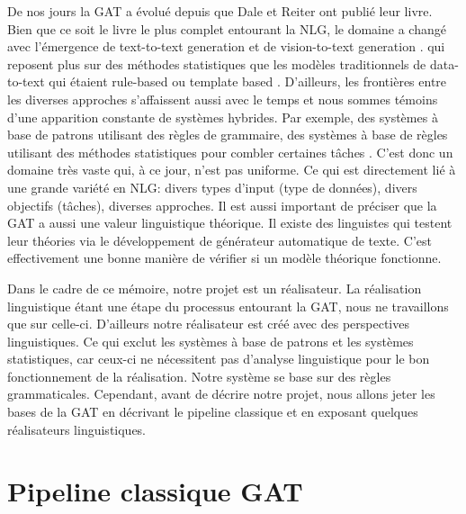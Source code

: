 De nos jours la \ac{GAT} a évolué depuis que Dale et Reiter ont publié leur livre. Bien que ce soit le livre le plus complet entourant la NLG, le domaine a changé avec l'émergence de text-to-text generation et de vision-to-text generation \citep{DBLP:journals/corr/HendricksARDSD16}. qui reposent plus sur des méthodes statistiques que les modèles traditionnels de data-to-text qui étaient rule-based ou template based \citep{gatt18}. D'ailleurs, les frontières entre les diverses approches s'affaissent aussi avec le temps et nous sommes témoins d'une apparition constante de systèmes hybrides. Par exemple, des systèmes à base de patrons utilisant des règles de grammaire, des systèmes à base de règles utilisant des méthodes statistiques pour combler certaines tâches \citep{gatt18}. C'est donc un domaine très vaste qui, à ce jour, n'est pas uniforme. Ce qui est directement lié à une grande variété en NLG: divers types d'input (type de données), divers objectifs (tâches), diverses approches. Il est aussi important de préciser que la \ac{GAT} a aussi une valeur linguistique théorique. Il existe des linguistes qui testent leur théories via le développement de générateur automatique de texte. C'est effectivement une bonne manière de vérifier si un modèle théorique fonctionne\citep{DanlosPresentationmodelegeneration1983}. 

Dans le cadre de ce mémoire, notre projet est un réalisateur. La réalisation linguistique étant une étape du processus entourant la \ac{GAT}, nous ne travaillons que sur celle-ci. D'ailleurs notre réalisateur est créé avec des perspectives linguistiques. Ce qui exclut les systèmes à base de patrons et les systèmes statistiques, car ceux-ci ne nécessitent pas d'analyse linguistique pour le bon fonctionnement de la réalisation. Notre système se base sur des règles grammaticales. Cependant, avant de décrire notre projet, nous allons jeter les bases de la \ac{GAT} en décrivant le pipeline classique et en exposant quelques réalisateurs linguistiques.


\section{Pipeline classique GAT} \label{ppc}


